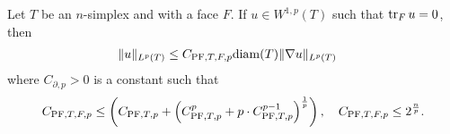 \documentclass[a4paper]{article}
\begin{document}
\begin{lemma}\label{lemma:mixedbconsimplex}
    Let $T$ be an $n$-simplex and with a face $F$. 
    If $u \in W^{1,p}(T)$ such that $\operatorname{tr}_{F} u = 0$, then 
    \begin{align*}
        \| u \|_{L^{p}(T)}
        &
        \leq 
        C_{{\rm PF},T,F,p} {\operatorname{diam}}(T) \| \nabla u \|_{L^{p}(T)}
    \end{align*}
    where $C_{\partial,p} > 0$ is a constant such that 
    \begin{align*}
        C_{{\rm PF},T,F,p}
        \leq 
        \left( C_{{\rm PF},T,p} + \left( C_{{\rm PF},T,p}^{p} + p \cdot C_{{\rm PF},T,p}^{p-1} \right)^{\frac 1 p} \right),  
        \quad 
        C_{{\rm PF},T,F,p}
        \leq 
        2^{\frac n p}
        .
    \end{align*}
\end{lemma}
\end{document}
